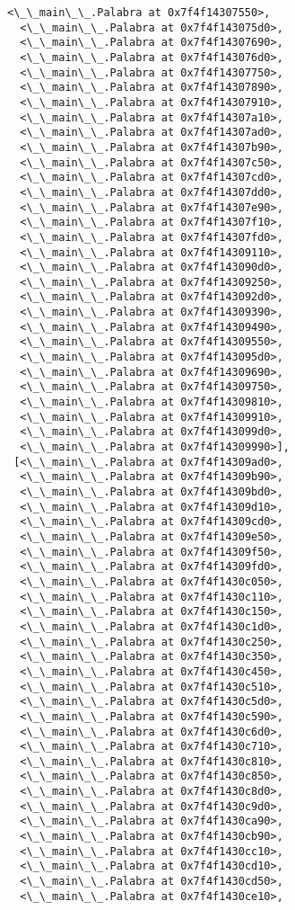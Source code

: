 \documentclass[12pt,a4paper,table]{article}
\begin{document}
\begin{tcolorbox}[breakable, size=fbox, boxrule=.5pt, pad at break*=1mm, opacityfill=0]
\begin{Verbatim}[commandchars=\\\{\}]
  <\_\_main\_\_.Palabra at 0x7f4f14307550>,
  <\_\_main\_\_.Palabra at 0x7f4f143075d0>,
  <\_\_main\_\_.Palabra at 0x7f4f14307690>,
  <\_\_main\_\_.Palabra at 0x7f4f143076d0>,
  <\_\_main\_\_.Palabra at 0x7f4f14307750>,
  <\_\_main\_\_.Palabra at 0x7f4f14307890>,
  <\_\_main\_\_.Palabra at 0x7f4f14307910>,
  <\_\_main\_\_.Palabra at 0x7f4f14307a10>,
  <\_\_main\_\_.Palabra at 0x7f4f14307ad0>,
  <\_\_main\_\_.Palabra at 0x7f4f14307b90>,
  <\_\_main\_\_.Palabra at 0x7f4f14307c50>,
  <\_\_main\_\_.Palabra at 0x7f4f14307cd0>,
  <\_\_main\_\_.Palabra at 0x7f4f14307dd0>,
  <\_\_main\_\_.Palabra at 0x7f4f14307e90>,
  <\_\_main\_\_.Palabra at 0x7f4f14307f10>,
  <\_\_main\_\_.Palabra at 0x7f4f14307fd0>,
  <\_\_main\_\_.Palabra at 0x7f4f14309110>,
  <\_\_main\_\_.Palabra at 0x7f4f143090d0>,
  <\_\_main\_\_.Palabra at 0x7f4f14309250>,
  <\_\_main\_\_.Palabra at 0x7f4f143092d0>,
  <\_\_main\_\_.Palabra at 0x7f4f14309390>,
  <\_\_main\_\_.Palabra at 0x7f4f14309490>,
  <\_\_main\_\_.Palabra at 0x7f4f14309550>,
  <\_\_main\_\_.Palabra at 0x7f4f143095d0>,
  <\_\_main\_\_.Palabra at 0x7f4f14309690>,
  <\_\_main\_\_.Palabra at 0x7f4f14309750>,
  <\_\_main\_\_.Palabra at 0x7f4f14309810>,
  <\_\_main\_\_.Palabra at 0x7f4f14309910>,
  <\_\_main\_\_.Palabra at 0x7f4f143099d0>,
  <\_\_main\_\_.Palabra at 0x7f4f14309990>],
 [<\_\_main\_\_.Palabra at 0x7f4f14309ad0>,
  <\_\_main\_\_.Palabra at 0x7f4f14309b90>,
  <\_\_main\_\_.Palabra at 0x7f4f14309bd0>,
  <\_\_main\_\_.Palabra at 0x7f4f14309d10>,
  <\_\_main\_\_.Palabra at 0x7f4f14309cd0>,
  <\_\_main\_\_.Palabra at 0x7f4f14309e50>,
  <\_\_main\_\_.Palabra at 0x7f4f14309f50>,
  <\_\_main\_\_.Palabra at 0x7f4f14309fd0>,
  <\_\_main\_\_.Palabra at 0x7f4f1430c050>,
  <\_\_main\_\_.Palabra at 0x7f4f1430c110>,
  <\_\_main\_\_.Palabra at 0x7f4f1430c150>,
  <\_\_main\_\_.Palabra at 0x7f4f1430c1d0>,
  <\_\_main\_\_.Palabra at 0x7f4f1430c250>,
  <\_\_main\_\_.Palabra at 0x7f4f1430c350>,
  <\_\_main\_\_.Palabra at 0x7f4f1430c450>,
  <\_\_main\_\_.Palabra at 0x7f4f1430c510>,
  <\_\_main\_\_.Palabra at 0x7f4f1430c5d0>,
  <\_\_main\_\_.Palabra at 0x7f4f1430c590>,
  <\_\_main\_\_.Palabra at 0x7f4f1430c6d0>,
  <\_\_main\_\_.Palabra at 0x7f4f1430c710>,
  <\_\_main\_\_.Palabra at 0x7f4f1430c810>,
  <\_\_main\_\_.Palabra at 0x7f4f1430c850>,
  <\_\_main\_\_.Palabra at 0x7f4f1430c8d0>,
  <\_\_main\_\_.Palabra at 0x7f4f1430c9d0>,
  <\_\_main\_\_.Palabra at 0x7f4f1430ca90>,
  <\_\_main\_\_.Palabra at 0x7f4f1430cb90>,
  <\_\_main\_\_.Palabra at 0x7f4f1430cc10>,
  <\_\_main\_\_.Palabra at 0x7f4f1430cd10>,
  <\_\_main\_\_.Palabra at 0x7f4f1430cd50>,
  <\_\_main\_\_.Palabra at 0x7f4f1430ce10>,

\end{Verbatim}
\end{tcolorbox}
\end{document}
